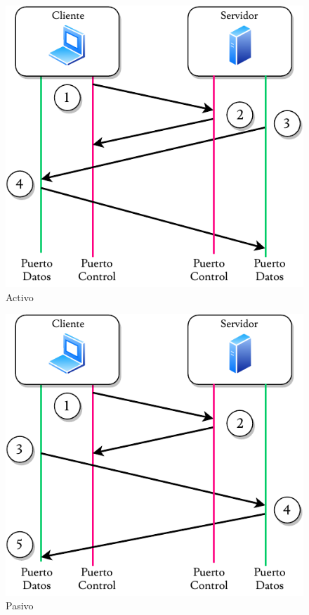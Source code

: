 \noindent
\begin{minipage}[t]{.5\textwidth}
\raggedright
   \begin{figure}[H]                           
\centering                                  
\includegraphics[page=1,scale=0.7]{Activo.pdf}
\caption{Activo} 
\end{figure}    
\end{minipage}%
\begin{minipage}[t]{.5\textwidth}
\raggedright
\begin{figure}[H]                           
\centering                                  
\includegraphics[page=1,scale=0.7]{Pasivo.pdf}
\caption{Pasivo} 
\end{figure}    
\end{minipage}
